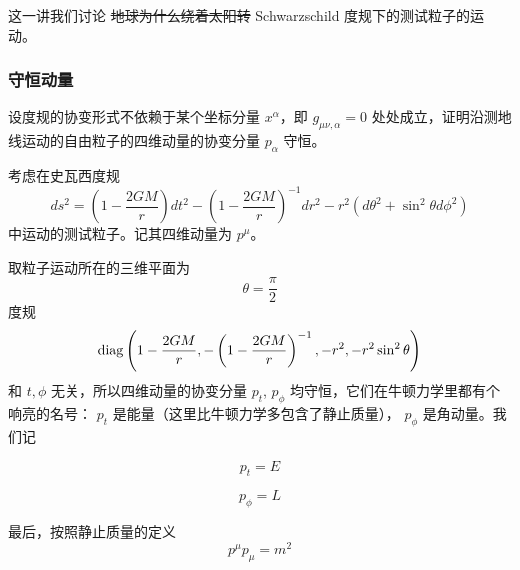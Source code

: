 \documentclass[CJK,13pt]{beamer}
\date{}
\begin{document}
  \bch

  \begin{frame}
    这一讲我们讨论 \sout{地球为什么绕着太阳转} Schwarzschild 度规下的测试粒子的运动。

    
  \end{frame}

  \begin{frame}
    \frametitle{守恒动量}

    设度规的协变形式不依赖于某个坐标分量 $x^\alpha$，即 $g_{\mu\nu,\alpha}=0$ 处处成立，证明沿测地线运动的自由粒子的四维动量的协变分量 $p_\alpha$ 守恒。

  \end{frame}



  \begin{frame}
    考虑在史瓦西度规
    $$ ds^2 = \left(1-\frac{2GM}{r}\right)dt^2 - \left(1-\frac{2GM}{r}\right)^{-1} dr^2 - r^2\left(d\theta^2 + \sin^2\theta d\phi^2\right)$$
    中运动的测试粒子。记其四维动量为 $p^\mu$。
  \end{frame}
    
  \begin{frame}
    取粒子运动所在的三维平面为
   {\blue \begin{equation}
      \theta  = \frac{\pi}{2} \label{eq:theta}
    \end{equation}}
    度规
    $$ \mathrm{diag}\,{\left(1-\frac{2GM}{r}, -\left(1-\frac{2GM}{r}\right)^{-1},-r^2, -r^2\sin^2\theta\right)}$$
    和 $t, \phi$ 无关，所以四维动量的协变分量 $p_t$, $p_\phi$ 均守恒，它们在牛顿力学里都有个响亮的名号： $p_t$ 是能量（这里比牛顿力学多包含了静止质量）， $p_\phi$ 是角动量。我们记
    {\blue
    \begin{equation}
      p_t = E \label{eq:t}
    \end{equation}

    \begin{equation}
      p_\phi = L \label{eq:phi}
    \end{equation}
    }
    最后，按照静止质量的定义
{\blue    \begin{equation}
      p^\mu p_\mu=m^2 \label{eq:m2}
    \end{equation}}
  \end{frame}
  
\end{document}
